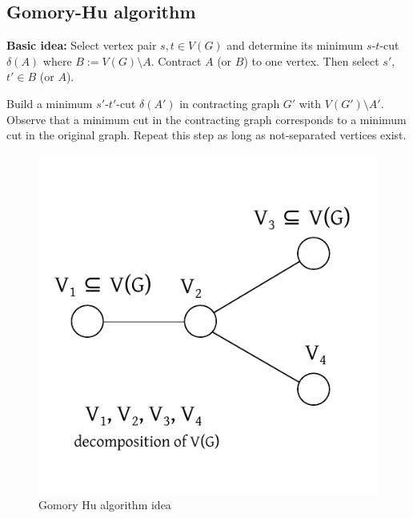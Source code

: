 \documentclass[a4paper]{article}
\theoremstyle{definition}
\begin{document}
\subsection{Gomory-Hu algorithm}
\textbf{Basic idea:}
  Select vertex pair $s, t \in V(G)$ and determine its minimum $s$-$t$-cut $\delta(A)$ where $B := V(G) \setminus A$. Contract $A$ (or $B$) to one vertex. Then select $s'$, $t' \in B$ (or $A$).

  Build a minimum $s'$-$t'$-cut $\delta(A')$ in contracting graph $G'$ with $V(G') \setminus A'$. Observe that a minimum cut in the contracting graph corresponds to a minimum cut in the original graph. Repeat this step as long as not-separated vertices exist.

\begin{figure}[ht]
 \begin{center}
  \includegraphics{img/gomory_hu_algo_idea.pdf}
  \caption{Gomory Hu algorithm idea}
 \end{center}
\end{figure}
\end{document}
